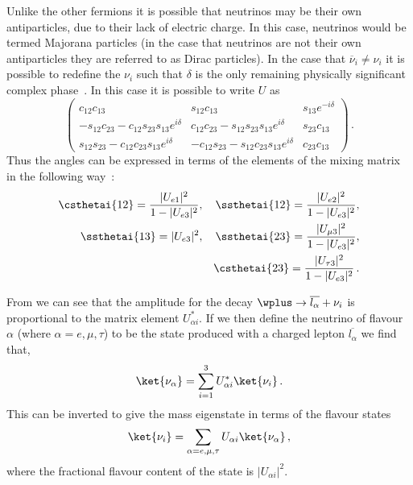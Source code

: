 Unlike the other fermions it is possible that neutrinos may be their own antiparticles, due to their lack of electric charge.
In this case, neutrinos would be termed Majorana particles (in the case that neutrinos are not their own antiparticles they are referred to as Dirac particles).
In the case that $\overline{\nu}_{i} \neq \nu_{i}$ it is possible to redefine the $\nu_{i}$ such that $\delta$ is the only remaining physically significant complex phase~\cite{cpvMajorana}.
In this case it is possible to write $U$ as
\begin{equation}
  \begin{pmatrix}
    c_{12}c_{13} & s_{12}c_{13} & s_{13} e^{-i\delta} \\
    -s_{12}c_{23}-c_{12}s_{23}s_{13}e^{i\delta} & c_{12}c_{23}-s_{12}s_{23}s_{13}e^{i\delta} & s_{23}c_{13} \\
    s_{12}s_{23}-c_{12}c_{23}s_{13}e^{i\delta} & -c_{12}s_{23}-s_{12}c_{23}s_{13}e^{i\delta} & c_{23}c_{13} 
  \end{pmatrix} \, .
\end{equation}
Thus the angles can be expressed in terms of the elements of the mixing matrix in the following way~\cite{pdg2018}:
\begin{equation}
\begin{split}
  \csthetai{12} = \frac{|U_{e1}|^{2}}{1 - |U_{e3}|^{2}}, \quad \ssthetai{12} = \frac{|U_{e2}|^{2}}{1 - |U_{e3}|^{2}}, \\
  \ssthetai{13} = |U_{e3}|^{2}, \quad \ssthetai{23} = \frac{|U_{\mu 3}|^{2}}{1 - |U_{e3}|^{2}}, \\
  \csthetai{23} = \frac{|U_{\tau 3}|^{2}}{1 - |U_{e3}|^{2}} \, .
\end{split}
\end{equation}

From  we can see that the amplitude for the decay $\wplus \rightarrow \overline{l_{\alpha}} + \nu_{i}$ is proportional to the matrix element $U_{\alpha i}^{*}$.
If we then define the neutrino of flavour $\alpha$ (where $\alpha = e, \mu, \tau$) to be the state produced with a charged lepton $\overline{l_{\alpha}}$ we find that,
\begin{equation}
  \ket{\nu_{\alpha}} = \sum_{i=1}^{3} U^{*}_{\alpha i} \ket{\nu_{i}} \, .
\end{equation}
This can be inverted to give the mass eigenstate in terms of the flavour states
\begin{equation}
  \ket{\nu_{i}} = \sum_{\alpha=e, \mu, \tau} U_{\alpha i} \ket{\nu_{\alpha}} \, ,
\end{equation}
where the fractional flavour content of the state is $|U_{\alpha i}|^{2}$.

